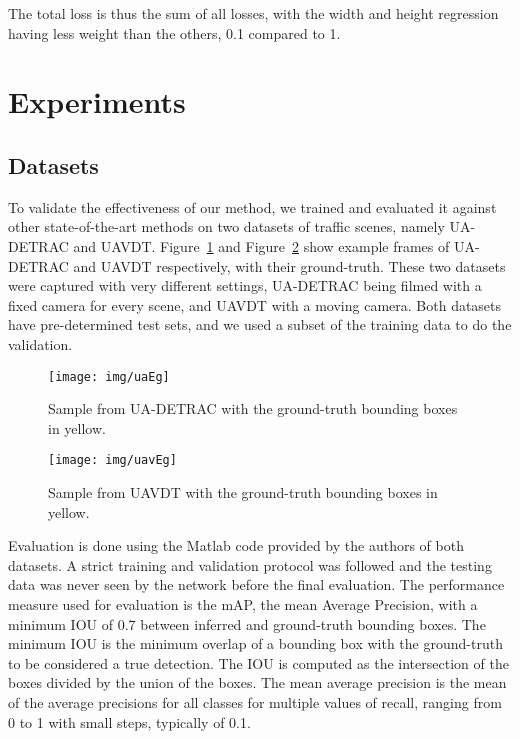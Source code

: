 \documentclass[10pt, conference, compsocconf]{IEEEtran}
\begin{document}
The total loss is thus the sum of all losses, with the width and height regression having less weight than the others, 0.1 compared to 1.

\section{Experiments}

\subsection{Datasets}

To validate the effectiveness of our method, we trained and evaluated it against other state-of-the-art methods on two datasets of traffic scenes, namely UA-DETRAC\cite{Wen2015Tracking} and UAVDT\cite{du2018unmanned}. Figure~\ref{ua-detrac} and Figure~\ref{UAVDT} show example frames of UA-DETRAC and UAVDT respectively, with their ground-truth. These two datasets were captured with very different settings, UA-DETRAC being filmed with a fixed camera for every scene, and UAVDT with a moving camera. Both datasets have pre-determined test sets, and we used a subset of the training data to do the validation. 


\begin{figure}[ht]
\begin{center}
\texttt{[image: img/uaEg]}
\end{center}
   \caption{Sample from UA-DETRAC with the ground-truth bounding boxes in yellow.}
\label{ua-detrac}
\end{figure}

\begin{figure}[ht]
\begin{center}
\texttt{[image: img/uavEg]}
\end{center}
   \caption{Sample from UAVDT with the ground-truth bounding boxes in yellow.}
\label{UAVDT}
\end{figure}

Evaluation is done using the Matlab code provided by the authors of both datasets. A strict training and validation protocol was followed and the testing data was never seen by the network before the final evaluation. The performance measure used for evaluation is the mAP, the mean Average Precision, with a minimum IOU of 0.7 between inferred and ground-truth bounding boxes. The minimum IOU is the minimum overlap of a bounding box with the ground-truth to be considered a true detection. The IOU is computed as the intersection of the boxes divided by the union of the boxes. The mean average precision is the mean of the average precisions for all classes for multiple values of recall, ranging from 0 to 1 with small steps, typically of 0.1.  
\end{document}
